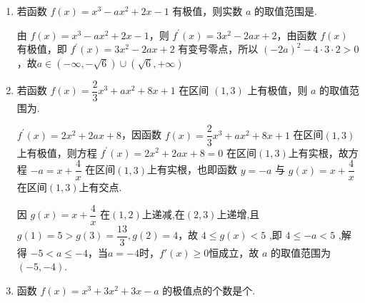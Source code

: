 \begin{enumerate}
\begin{jieda}
        ${f}^{\prime }\left( x\right)  = 3{x}^{2} - {2ax} + b$ ,所以 ${f}^{\prime }\left( 1\right)  = 3 - {2a} + b = 0$，又 $f\left( 1\right)  = 1 - a + b = 4$，解得 $a = 6,b = 9$ ,经验证符合题意，所以 $a - b = 6 - 9 =  - 3$
    \end{jieda}

    \item 若函数 $f\left( x\right)  = {x}^{3} - a{x}^{2} + {2x} - 1$ 有极值，则实数 $a$ 的取值范围是.
    \begin{jieda}
        由 $f\left( x\right)  = {x}^{3} - a{x}^{2} + {2x} - 1$，则 ${f}^{\prime }\left( x\right)  = 3{x}^{2} - {2ax} + 2$，由函数 $f\left( x\right)$ 有极值，即 ${f}^{\prime }\left( x\right)  = 3{x}^{2} - {2ax} + 2$ 有变号零点，所以 ${\left( -2a\right) }^{2} - 4 \cdot  3 \cdot  2 > 0$，故$a \in \left( {-\infty , - \sqrt{6}}\right)  \cup  \left( {\sqrt{6}, + \infty }\right)$
    \end{jieda}

    \item 若函数 $f\left( x\right)  = \dfrac{2}{3}{x}^{3} + a{x}^{2} + {8x} + 1$ 在区间 $\left( {1,3}\right)$ 上有极值，则 $a$ 的取值范围为.
    \begin{jieda}
        ${f}^{\prime }\left( x\right)  = 2{x}^{2} + {2ax} + 8$，因函数 $f\left( x\right)  = \dfrac{2}{3}{x}^{3} + a{x}^{2} + {8x} + 1$ 在区间$(1,3)$上有极值，则方程 ${f}^{\prime }\left( x\right)  = 2{x}^{2} + {2ax} + 8 = 0$ 在区间$(1,3)$上有实根，故方程 $- a = x + \dfrac{4}{x}$ 在区间$(1,3)$上有实根，也即函数 $y =  - a$ 与 $g\left( x\right)  = x + \dfrac{4}{x}$ 在区间$(1,3)$上有交点.
        
        因 $g\left( x\right)  = x + \dfrac{4}{x}$ 在$(1,2)$上递减,在$(2,3)$上递增,且 $g\left( 1\right)  = 5 > g\left( 3\right)  = \dfrac{13}{3},g\left( 2\right)  = 4$，故 $4 \leq  g\left( x\right)  < 5$ ,即 $4 \leq   - a < 5$ ,解得 $- 5 < a \leq  -4$，当$a = -4$时，$f'(x) \geq 0$恒成立，故 $a$ 的取值范围为$(-5, -4)$.
    \end{jieda}

    \item 函数 $f\left( x\right)  = {x}^{3} + 3{x}^{2} + {3x} - a$ 的极值点的个数是个.


\end{enumerate}
